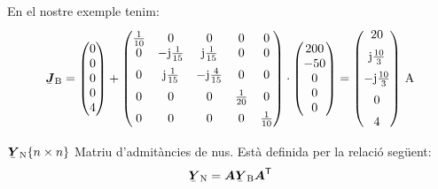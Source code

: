 \begin{list}{}
   En el nostre exemple tenim:
   \[
      \mcmplx{J}\ped{B} =
      \begin{pmatrix} 0 \\ 0 \\ 0 \\ 0 \\ 4 \end{pmatrix} +
       \begin{pmatrix}
            \frac{1}{10} & 0 & 0 & 0 & 0 \\
            0 & -\ju\frac{1}{15} & \ju\frac{1}{15} & 0 & 0 \\[2mm]
            0 & \ju\frac{1}{15} & -\ju\frac{4}{15} & 0 & 0 \\[2mm]
            0 & 0 & 0 & \frac{1}{20} & 0 \\[2mm]
            0 & 0 & 0 & 0 & \frac{1}{10}
      \end{pmatrix} \cdot
      \begin{pmatrix} 200 \\ -50 \\ 0 \\ 0 \\ 0 \end{pmatrix} =
      \begin{pmatrix}
            20 \\[2mm]
             \ju \frac{10}{3} \\[2mm]
             -\ju \frac{10}{3} \\[2mm]
             0 \\[2mm]
              4
      \end{pmatrix}
     \unit{A}
   \]

   \item[$\mcmplx{Y}\ped{N}\{n\times n\}$] Matriu d'admitàncies de nus. Està definida per la relació següent:
   \begin{equation}
      \mcmplx{Y}\ped{N} = \boldsymbol{A} \mcmplx{Y}\ped{B}
      \transp{\boldsymbol{A}}
   \end{equation}


\end{list}
